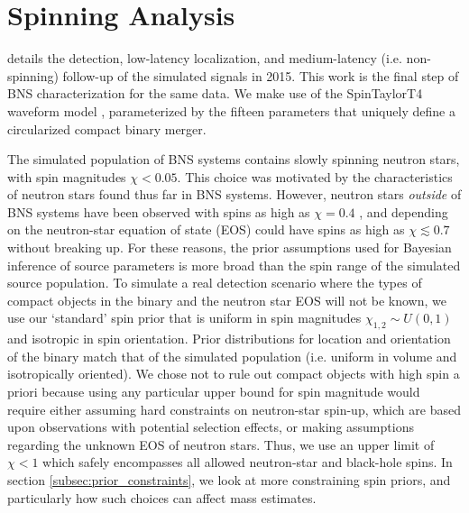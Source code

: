 \section{Spinning Analysis}
\label{sec:spin}

\citet{Singer_2014} details the detection, low-latency localization, and medium-latency (i.e. non-spinning) follow-up of the simulated signals in 2015. This work is the final step of BNS characterization for the same data. We make use of the SpinTaylorT4 waveform model \citep{Buonanno_2003,Buonanno_2009}, parameterized by the fifteen parameters that uniquely define a circularized compact binary merger.

The simulated population of BNS systems contains slowly spinning neutron stars, with spin magnitudes $\chi < 0.05$.  This choice was motivated by the characteristics of neutron stars found thus far in BNS systems. However, neutron stars \emph{outside} of BNS systems have been observed with spins as high as $\chi = 0.4$ \citep{Hessels_2006,Brown_2012}, and depending on the neutron-star equation of state (EOS) could have spins as high as $\chi \lesssim 0.7$ \citep{Lo_2011} without breaking up.  For these reasons, the prior assumptions used for Bayesian inference of source parameters is more broad than the spin range of the simulated source population.  To simulate a real detection scenario where the types of compact objects in the binary and the neutron star EOS will not be known, we use our `standard' spin prior that is uniform in spin magnitudes $\chi_{1,2} \sim U(0, 1)$ and isotropic in spin orientation. Prior distributions for location and orientation of the binary match that of the simulated population (i.e. uniform in volume and isotropically oriented).  We chose not to rule out compact objects with high spin a priori because using any particular upper bound for spin magnitude would require either assuming hard constraints on neutron-star spin-up, which are based upon observations with potential selection effects, or making assumptions regarding the unknown EOS of neutron stars. Thus, we use an upper limit of $\chi < 1$ which safely encompasses all allowed neutron-star and black-hole spins.  In section \ref{subsec:prior_constraints}, we look at more constraining spin priors, and particularly how such choices can affect mass estimates.